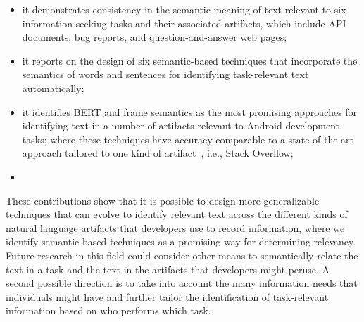\begin{itemize}
    \item it demonstrates consistency in the semantic meaning of text relevant to six information-seeking tasks and their associated artifacts, which include API documents, bug reports, and question-and-answer web pages;
    \item it reports on the design of six semantic-based techniques that incorporate the semantics of words and sentences for identifying task-relevant text automatically;
    \item it identifies BERT and frame semantics as the most promising approaches for identifying text in 
    a number of artifacts relevant to Android development tasks; where these techniques have  accuracy comparable to a state-of-the-art approach     tailored to one kind of artifact~\cite{Xu2017}, i.e., Stack Overflow;
    \item {}
    
\end{itemize}



These contributions show that it is possible to design 
more generalizable techniques
that can evolve to 
identify relevant text across the different kinds of natural language artifacts that 
developers use to record information, where we identify semantic-based techniques as a promising way for determining relevancy. Future research in this field could consider other means to semantically relate the text in a task and the text in the artifacts that developers might peruse.
A second possible direction is to take into account the many information needs that individuals might have and further tailor the identification of task-relevant information based on who performs which task.



